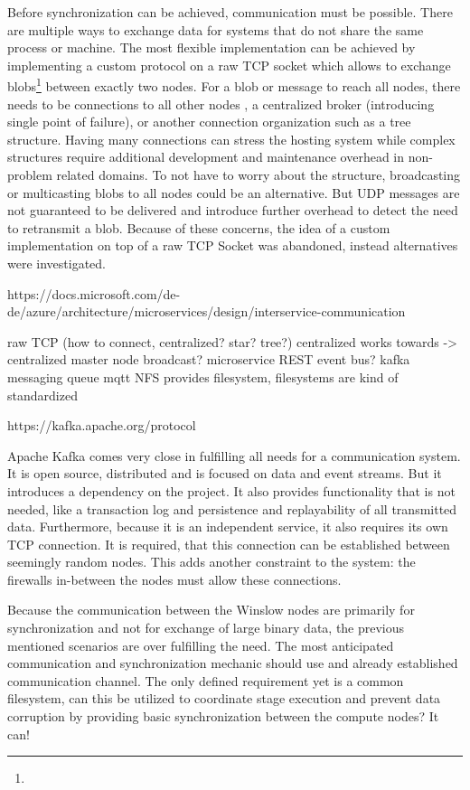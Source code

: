Before synchronization can be achieved, communication must be possible.
There are multiple ways to exchange data for systems that do not share the same process or machine.
The most flexible implementation can be achieved by implementing a custom protocol on a raw TCP socket which allows to exchange blobs\footnote{} between exactly two nodes.
For a blob or message to reach all nodes, there needs to be connections to all other nodes , a centralized broker (introducing single point of failure), or another connection organization such as a tree structure.
Having many connections can stress the hosting system while complex structures require additional development and maintenance overhead in non-problem related domains.
To not have to worry about the structure, broadcasting or multicasting blobs to all nodes could be an alternative.
But UDP messages are not guaranteed to be delivered and introduce further overhead to detect the need to retransmit a blob.
Because of these concerns, the idea of a custom implementation on top of a raw TCP Socket was abandoned, instead alternatives were investigated.


https://docs.microsoft.com/de-de/azure/architecture/microservices/design/interservice-communication


raw TCP (how to connect, centralized? star? tree?) centralized works towards -> centralized master node
broadcast?
microservice REST
event bus? kafka
messaging queue mqtt
NFS provides filesystem, filesystems are kind of standardized

https://kafka.apache.org/protocol

Apache Kafka  comes very close in fulfilling all needs for a communication system.
It is open source, distributed and is focused on data and event streams.
But it introduces a dependency on the project.
It also provides functionality that is not needed, like a transaction log and persistence and replayability of all transmitted data.
Furthermore, because it is an independent service, it also requires its own TCP connection.
It is required, that this connection can be established between seemingly random nodes.
This adds another constraint to the system: the firewalls in-between the nodes must allow these connections.

Because the communication between the Winslow nodes are primarily for synchronization and not for exchange of large binary data, the previous mentioned scenarios are over fulfilling the need.
The most anticipated communication and synchronization mechanic should use and already established communication channel.
The only defined requirement yet is a common filesystem, can this be utilized to coordinate stage execution and prevent data corruption by providing basic synchronization between the compute nodes? It can!


